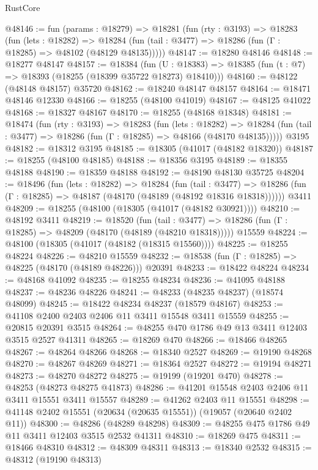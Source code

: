 \begin{lexlean}{RustCore}
\begin{coremodule}
@48146 := fun (params : @18279) =>
  @18281
    (fun (rty : @3193) =>
    @18283
      (fun (lets : @18282) =>
      @18284 (fun (tail : @3477) => @18286 (fun (Γ : @18285) => @48102 (@48129 @48135)))))
@48147 := @18280 @48146
@48148 := @18277 @48147
@48157 := @18384
    (fun (U : @18383) => @18385 (fun (t : @7) => @18393 (@18255 (@18399 @35722 @18273) @18410)))
@48160 := @48122 (@48148 @48157) @35720
@48162 := @18240 @48147 @48157
@48164 := @18471 @48146 @12330
@48166 := @18255 (@48100 @41019)
@48167 := @48125 @41022
@48168 := @18327 @48167
@48170 := @18255 (@48168 @18348)
@48181 := @18474
    (fun (rty : @3193) =>
    @18283
      (fun (lets : @18282) =>
      @18284 (fun (tail : @3477) => @18286 (fun (Γ : @18285) => @48166 (@48170 @48135)))))
    @3195
@48182 := @18312 @3195
@48185 := @18305 (@41017 (@48182 @18320))
@48187 := @18255 (@48100 @48185)
@48188 := @18356 @3195
@48189 := @18355 @48188
@48190 := @18359 @48188
@48192 := @48190 @48130 @35725
@48204 := @18496
    (fun (lets : @18282) =>
    @18284
      (fun (tail : @3477) =>
      @18286 (fun (Γ : @18285) => @48187 (@48170 (@48189 (@48192 @18316 @18318))))))
    @3411
@48209 := @18255 (@48100 (@18305 (@41017 (@48182 @30921))))
@48210 := @48192 @3411
@48219 := @18520
    (fun (tail : @3477) => @18286 (fun (Γ : @18285) => @48209 (@48170 (@48189 (@48210 @18318)))))
    @15559
@48224 := @48100 (@18305 (@41017 (@48182 (@18315 @15560))))
@48225 := @18255 @48224
@48226 := @48210 @15559
@48232 := @18538 (fun (Γ : @18285) => @48225 (@48170 (@48189 @48226))) @20391
@48233 := @18422 @48224
@48234 := @48168 @41092
@48235 := @18255 @48234
@48236 := @41095 @48188
@48237 := @48236 @48226
@48241 := @48233 (@48235 @48237) (@18574 @48099)
@48245 := @18422 @48234 @48237 (@18579 @48167)
@48253 := @41108 @2400 @2403 @2406 @11 @3411 @15548 @3411 @15559
@48255 := @20815 @20391 @3515
@48264 := @48255 @470 @1786 @49 @13 @3411 @12403 @3515 @2527 @41311
@48265 := @18269 @470
@48266 := @18466 @48265
@48267 := @48264 @48266
@48268 := @18340 @2527
@48269 := @19190 @48268
@48270 := @48267 @48269
@48271 := @18364 @2527
@48272 := @19194 @48271
@48273 := @48270 @48272
@48275 := @19199 (@19201 @470)
@48278 := @48253 (@48273 @48275 @41873)
@48286 := @41201 @15548 @2403 @2406 @11 @3411 @15551 @3411 @15557
@48289 := @41262 @2403 @11 @15551
@48298 := @41148 @2402 @15551 (@20634 (@20635 @15551)) (@19057 (@20640 @2402 @11))
@48300 := @48286 (@48289 @48298)
@48309 := @48255 @475 @1786 @49 @11 @3411 @12403 @3515 @2532 @41311
@48310 := @18269 @475
@48311 := @18466 @48310
@48312 := @48309 @48311
@48313 := @18340 @2532
@48315 := @48312 (@19190 @48313)

\end{coremodule}
\end{lexlean}
